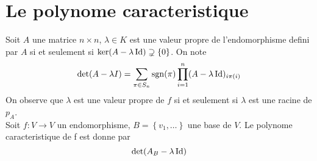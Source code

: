 \documentclass[../main.tex]{subfiles}
\begin{document}
\section{Le polynome caracteristique}
Soit $A$ une matrice $n \times n$, $\lambda \in K$ est une valeur propre de l'endomorphisme defini par $A$ si et seulement si $\ker( A - \lambda\operatorname*{Id}) \supsetneq \left\{ 0 \right\}  $.
On note
\[ 
	\det( A- \lambda I) = \sum_{\pi \in S_n}  \operatorname*{sgn}( \pi ) \prod_{i=1}^{n}( A-\lambda \operatorname*{Id})_{i\pi( i) } 
\]
On observe que $\lambda$ est une valeur propre de $f$ si et seulement si $\lambda$ est une racine de $p_A$.\\
Soit $f:V \to V$ un endomorphisme, $B= \left\{ v_1, \ldots \right\} $ une base de $V$. Le polynome caracteristique de f est donne par
\[ 
	\det ( A_B - \lambda \operatorname*{Id}) 
\]
\end{document}
